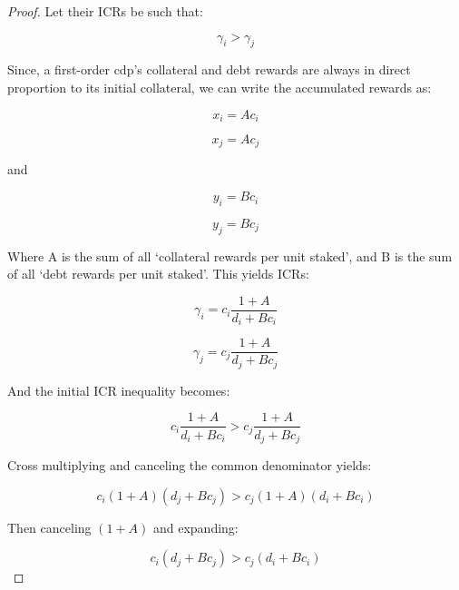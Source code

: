 \documentclass[reqno]{article}
\begin{document}
\begin{proof}
Let their ICRs be such that:

\begin{equation} 
    \gamma_i > \gamma_j
\end{equation}

\bigskip
Since, a first-order cdp’s collateral and debt rewards are always in direct proportion to its initial collateral, we can write the accumulated rewards as:

\begin{equation} 
    x_i=Ac_i
\end{equation}

\begin{equation} 
    x_j=Ac_j
\end{equation}

and

\begin{equation} 
    y_i=Bc_i
\end{equation}

\begin{equation} 
    y_j=Bc_j
\end{equation}

\bigskip
Where A is the sum of all ‘collateral rewards per unit staked’, and B is the sum of all ‘debt rewards per unit staked’. This yields ICRs:

\begin{equation} 
    \gamma_i=c_i\frac{1+A}{d_i+Bc_i}
\end{equation}

\begin{equation} 
    \gamma_j=c_j\frac{1+A}{d_j+Bc_j}
\end{equation}

And the initial ICR inequality becomes:

\begin{equation} 
    c_i\frac{1+A}{d_i+Bc_i}>c_j\frac{1+A}{d_j+Bc_j}
\end{equation}

\bigskip
Cross multiplying and canceling the common denominator yields:

\begin{equation} 
    c_i\left(1+A\right)\left(d_j+Bc_j\right)>c_j\left(1+A\right)\left(d_i+Bc_i\right)
\end{equation}

Then canceling $(1+A)$ and expanding:

\begin{equation} 
    c_i\left(d_j+Bc_j\right)>c_j\left(d_i+Bc_i\right)
\end{equation}


\end{proof}
\end{document}
